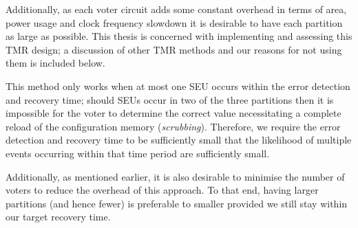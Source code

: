 \documentclass[12pt,final,oneside]{dwThesis} %
\begin{document}
   Additionally, as each voter circuit adds some constant overhead in terms of area, power usage and clock frequency slowdown it is desirable to have each partition as large as possible. This thesis is concerned with implementing and assessing this \ac{TMR} design; a discussion of other \ac{TMR} methods and our reasons for not using them is included below.

   This method only works when at most one \ac{SEU} occurs within the error detection and recovery time; should \acp{SEU} occur in two of the three partitions then it is impossible for the voter to determine the correct value necessitating a complete reload of the configuration memory (\textit{scrubbing}). Therefore, we require the error detection and recovery time to be sufficiently small that the likelihood of multiple events occurring within that time period are sufficiently small.

   Additionally, as mentioned earlier, it is also desirable to minimise the number of voters to reduce the overhead of this approach. To that end, having larger partitions (and hence fewer) is preferable to smaller provided we still stay within our target recovery time.
\end{document}
